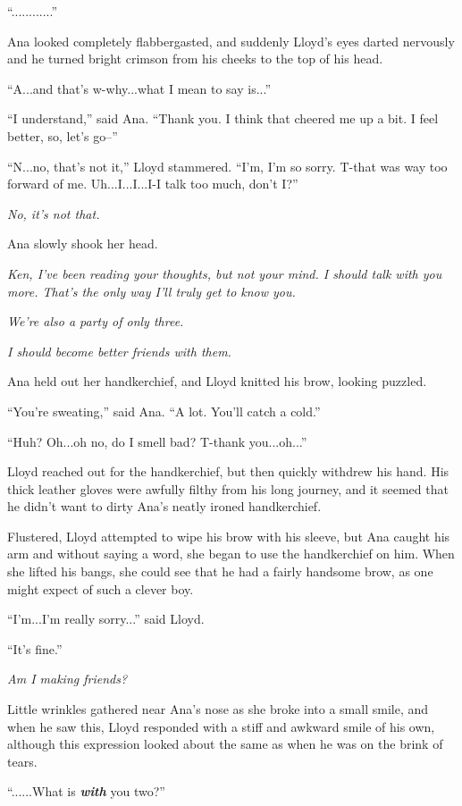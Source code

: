 \documentclass[
]{article}
\begin{document}
``............''

Ana looked completely flabbergasted, and suddenly Lloyd's eyes darted
nervously and he turned bright crimson from his cheeks to the top of his
head.

``A...and that's w-why...what I mean to say is...''

``I understand,'' said Ana. ``Thank you. I think that cheered me up a
bit. I feel better, so, let's go--''

``N...no, that's not it,'' Lloyd stammered. ``I'm, I'm so sorry. T-that
was way too forward of me. Uh...I...I...I-I talk too much, don't I?''

\emph{No, it's not that.}

Ana slowly shook her head.

\emph{Ken, I've been reading your thoughts, but not your mind. I should
talk with you more. That's the only way I'll truly get to know you.}

\emph{We're also a party of only three.}

\emph{I should become better friends with them.}

Ana held out her handkerchief, and Lloyd knitted his brow, looking
puzzled.

``You're sweating,'' said Ana. ``A lot. You'll catch a cold.''

``Huh? Oh...oh no, do I smell bad? T-thank you...oh...''

Lloyd reached out for the handkerchief, but then quickly withdrew his
hand. His thick leather gloves were awfully filthy from his long
journey, and it seemed that he didn't want to dirty Ana's neatly ironed
handkerchief.

Flustered, Lloyd attempted to wipe his brow with his sleeve, but Ana
caught his arm and without saying a word, she began to use the
handkerchief on him. When she lifted his bangs, she could see that he
had a fairly handsome brow, as one might expect of such a clever boy.

``I'm...I'm really sorry...'' said Lloyd.

``It's fine.''

\emph{Am I making friends?}

Little wrinkles gathered near Ana's nose as she broke into a small
smile, and when he saw this, Lloyd responded with a stiff and awkward
smile of his own, although this expression looked about the same as when
he was on the brink of tears.

``......What is \emph{\textbf{with}} you two?''
\end{document}
